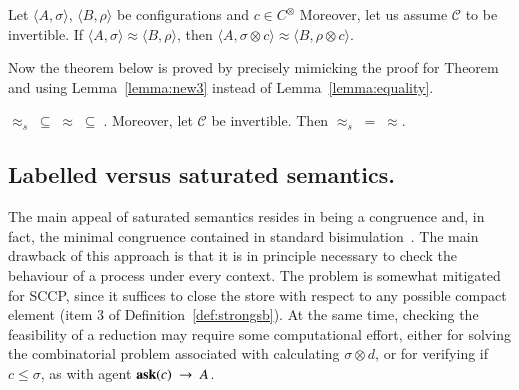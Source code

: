 \documentclass[main.tex]{subfiles}
\begin{document}
\begin{lemma}
\label{lemma:new3}
Let $\langle A, \sigma\rangle$, $\langle B, \rho\rangle$ be configurations and $c \in C^\otimes$
 Moreover, let us assume $\mathcal{C}$ to be invertible. 
If $\langle A, \sigma\rangle \approx \langle B, \rho\rangle$, then $\langle A, \sigma \otimes c \rangle \approx \langle B, \rho \otimes c\rangle$.
\end{lemma}

Now the theorem below is proved by precisely mimicking the proof for Theorem~ and using Lemma~\ref{lemma:new3} instead of Lemma~\ref{lemma:equality}.

\begin{theorem}
\label{th:wbisimiffwsbbisim}
$\approx_{\mathit{s}} \; \subseteq \; \approx  \; \subseteq \;$. Moreover, let $\mathcal{C}$ be invertible.
Then $\approx_{\mathit{s}} \; = \; \approx$.
\end{theorem}




\subsection{Labelled versus saturated semantics.} The main appeal of saturated semantics resides in 
 being a congruence and, in fact, the minimal congruence contained in standard bisimulation~\cite{barbedMontanari}. The main drawback of this approach is that it
is in principle necessary to check the behaviour of a process under every context. The problem is somewhat mitigated for SCCP, since it suffices to close the store with respect to any possible compact element (item 3 of Definition~\ref{def:strongsb}).
%
At the same time, checking the feasibility of a reduction may require some computational effort, either for solving the combinatorial problem 
associated with calculating $\sigma \otimes d$, or for verifying if $c \leq \sigma$, as with agent ${\bf ask}(c) \ \rightarrow \ A$. 
\end{document}

